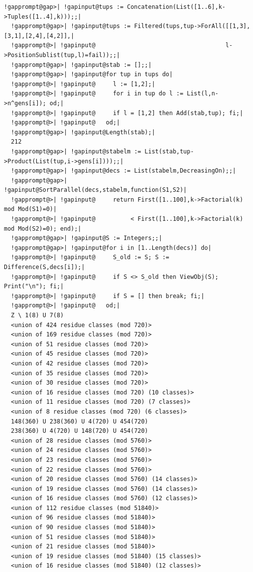 \documentclass[a4paper,11pt]{report}
\begin{document}
{{\begin{Verbatim}[commandchars=!@|,fontsize=\small,frame=single,label=Example]
  !gapprompt@gap>| !gapinput@tups := Concatenation(List([1..6],k->Tuples([1..4],k)));;|
  !gapprompt@gap>| !gapinput@tups := Filtered(tups,tup->ForAll([[1,3],[3,1],[2,4],[4,2]],|
  !gapprompt@>| !gapinput@                                     l->PositionSublist(tup,l)=fail));;|
  !gapprompt@gap>| !gapinput@stab := [];;|
  !gapprompt@gap>| !gapinput@for tup in tups do|
  !gapprompt@>| !gapinput@     l := [1,2];|
  !gapprompt@>| !gapinput@     for i in tup do l := List(l,n->n^gens[i]); od;|
  !gapprompt@>| !gapinput@     if l = [1,2] then Add(stab,tup); fi;|
  !gapprompt@>| !gapinput@   od;|
  !gapprompt@gap>| !gapinput@Length(stab);|
  212
  !gapprompt@gap>| !gapinput@stabelm := List(stab,tup->Product(List(tup,i->gens[i])));;|
  !gapprompt@gap>| !gapinput@decs := List(stabelm,DecreasingOn);;|
  !gapprompt@gap>| !gapinput@SortParallel(decs,stabelm,function(S1,S2)|
  !gapprompt@>| !gapinput@     return First([1..100],k->Factorial(k) mod Mod(S1)=0)|
  !gapprompt@>| !gapinput@          < First([1..100],k->Factorial(k) mod Mod(S2)=0); end);|
  !gapprompt@gap>| !gapinput@S := Integers;;|
  !gapprompt@gap>| !gapinput@for i in [1..Length(decs)] do|
  !gapprompt@>| !gapinput@     S_old := S; S := Difference(S,decs[i]);|
  !gapprompt@>| !gapinput@     if S <> S_old then ViewObj(S); Print("\n"); fi;|
  !gapprompt@>| !gapinput@     if S = [] then break; fi;|
  !gapprompt@>| !gapinput@   od;|
  Z \ 1(8) U 7(8)
  <union of 424 residue classes (mod 720)>
  <union of 169 residue classes (mod 720)>
  <union of 51 residue classes (mod 720)>
  <union of 45 residue classes (mod 720)>
  <union of 42 residue classes (mod 720)>
  <union of 35 residue classes (mod 720)>
  <union of 30 residue classes (mod 720)>
  <union of 16 residue classes (mod 720) (10 classes)>
  <union of 11 residue classes (mod 720) (7 classes)>
  <union of 8 residue classes (mod 720) (6 classes)>
  148(360) U 238(360) U 4(720) U 454(720)
  238(360) U 4(720) U 148(720) U 454(720)
  <union of 28 residue classes (mod 5760)>
  <union of 24 residue classes (mod 5760)>
  <union of 23 residue classes (mod 5760)>
  <union of 22 residue classes (mod 5760)>
  <union of 20 residue classes (mod 5760) (14 classes)>
  <union of 19 residue classes (mod 5760) (14 classes)>
  <union of 16 residue classes (mod 5760) (12 classes)>
  <union of 112 residue classes (mod 51840)>
  <union of 96 residue classes (mod 51840)>
  <union of 90 residue classes (mod 51840)>
  <union of 51 residue classes (mod 51840)>
  <union of 21 residue classes (mod 51840)>
  <union of 19 residue classes (mod 51840) (15 classes)>
  <union of 16 residue classes (mod 51840) (12 classes)>

\end{Verbatim}}}
\end{document}
